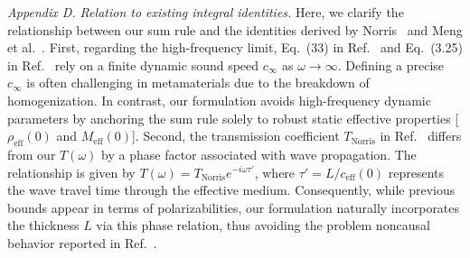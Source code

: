 \documentclass[final,5p,times,twocolumn]{elsarticle}
\begin{document}
{\color{black}\textit{Appendix D. Relation to existing integral identities.} Here, we clarify the relationship between our sum rule and the identities derived by Norris~\cite{norris2018integral} and Meng et al.~\cite{meng2022fundamental}. First, regarding the high-frequency limit, Eq.~(33) in Ref.~\cite{norris2018integral} and Eq.~(3.25) in Ref.~\cite{meng2022fundamental} rely on a finite dynamic sound speed $c_\infty$ as $\omega \to \infty$. Defining a precise $c_\infty$ is often challenging in metamaterials due to the breakdown of homogenization. In contrast, our formulation avoids high-frequency dynamic parameters by anchoring the sum rule solely to robust static effective properties [$\rho_{\text{eff}}(0)$ and $M_{\text{eff}}(0)$]. Second, the transmission coefficient $T_{\text{Norris}}$ in Ref.~\cite{norris2018integral} differs from our $T(\omega)$ by a phase factor associated with wave propagation. The relationship is given by $T(\omega) = T_{\text{Norris}} e^{-i\omega \tau'}$, where $\tau' = L/c_{\text{eff}}(0)$ represents the wave travel time through the effective medium. Consequently, while previous bounds appear in terms of polarizabilities, our formulation naturally incorporates the thickness $L$ via this phase relation, thus avoiding the problem noncausal behavior reported in Ref.~\cite{norris2015acoustic}.}
\end{document}
